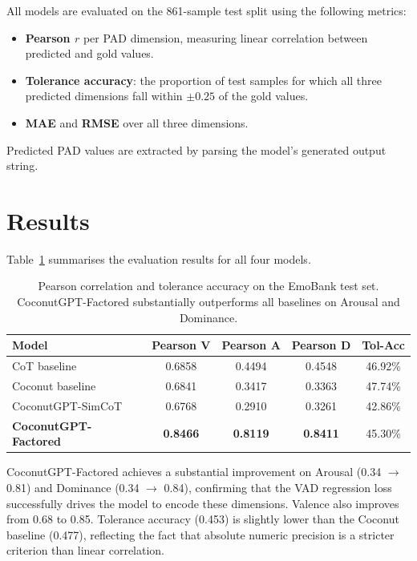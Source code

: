 \documentclass[12pt,twoside]{report}
\begin{document}
All models are evaluated on the 861-sample test split using the following metrics:

\begin{itemize}
    \item \textbf{Pearson $r$} per PAD dimension, measuring linear correlation between predicted and gold values.
    \item \textbf{Tolerance accuracy}: the proportion of test samples for which all three predicted dimensions fall within $\pm 0.25$ of the gold values.
    \item \textbf{MAE} and \textbf{RMSE} over all three dimensions.
\end{itemize}

Predicted PAD values are extracted by parsing the model's generated output string.

\section{Results}

Table~\ref{tab:main_results} summarises the evaluation results for all four models.

\begin{table}[H]
\centering
\begin{tabular}{lcccc}
\toprule
\textbf{Model} & \textbf{Pearson V} & \textbf{Pearson A} & \textbf{Pearson D} & \textbf{Tol-Acc} \\
\midrule
CoT baseline             & 0.6858 & 0.4494 & 0.4548 & 46.92\% \\
Coconut baseline         & 0.6841 & 0.3417 & 0.3363 & 47.74\% \\
CoconutGPT-SimCoT        & 0.6768 & 0.2910 & 0.3261 & 42.86\% \\
\textbf{CoconutGPT-Factored} & \textbf{0.8466} & \textbf{0.8119} & \textbf{0.8411} & 45.30\% \\
\bottomrule
\end{tabular}
\caption{Pearson correlation and tolerance accuracy on the EmoBank test set. CoconutGPT-Factored substantially outperforms all baselines on Arousal and Dominance.}
\label{tab:main_results}
\end{table}

CoconutGPT-Factored achieves a substantial improvement on Arousal (0.34 $\to$ 0.81) and Dominance (0.34 $\to$ 0.84), confirming that the VAD regression loss successfully drives the model to encode these dimensions.
Valence also improves from 0.68 to 0.85.
Tolerance accuracy (0.453) is slightly lower than the Coconut baseline (0.477), reflecting the fact that absolute numeric precision is a stricter criterion than linear correlation.
\end{document}

